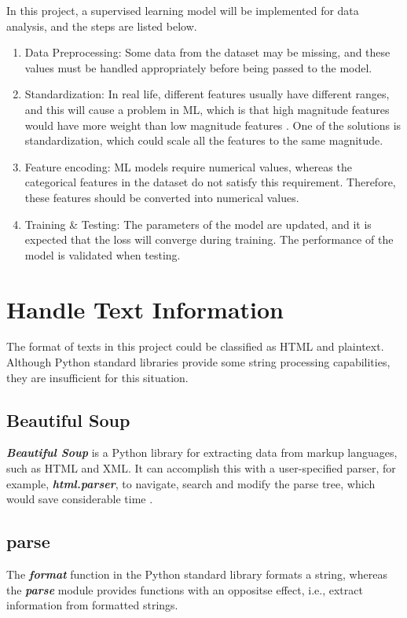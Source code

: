 \documentclass[12pt,twoside]{report}
\begin{document}
In this project, a supervised learning model will be implemented for data analysis, and the steps are listed below.
\begin{enumerate}
	\item Data Preprocessing: Some data from the dataset may be missing, and these values must be handled appropriately before being passed to the model. 
	\item Standardization: In real life, different features usually have different ranges, and this will cause a problem in ML, which is that high magnitude features would have more weight than low magnitude features \citep{RN4}. One of the solutions is standardization, which could scale all the features to the same magnitude.
	\item Feature encoding: ML models require numerical values, whereas the categorical features in the dataset do not satisfy this requirement. Therefore, these features should be converted into numerical values. 
	\item Training \& Testing: The parameters of the model are updated, and it is expected that the loss will converge during training. The performance of the model is validated when testing.
\end{enumerate}

\section{Handle Text Information}
The format of texts in this project could be classified as HTML and plaintext. Although Python standard libraries provide some string processing capabilities, they are insufficient for this situation. 

\subsection{Beautiful Soup}
\textit{\textbf{Beautiful Soup}} is a Python library for extracting data from markup languages, such as HTML and XML. It can accomplish this with a user-specified parser, for example, \textbf{\textit{html.parser}}, to navigate, search and modify the parse tree, which would save considerable time \citep{RN10}. 

\subsection{parse}
The \textit{\textbf{format}} function in the Python standard library formats a string, whereas the \textit{\textbf{parse}} module provides functions with an oppositse effect, i.e., extract information from formatted strings.
\end{document}
